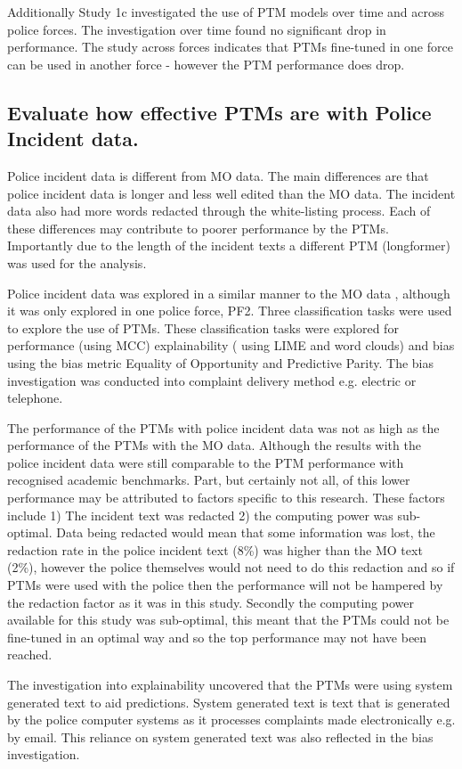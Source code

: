 Additionally Study 1c investigated the use of PTM models over time and across police forces. The investigation over time found no significant drop in performance. The study across forces indicates that PTMs fine-tuned in one force can be used in another force - however the PTM performance does drop. 
 
 
\subsection{Evaluate how effective PTMs are with Police Incident data.} Police incident data is different from MO data. The main differences are that police incident data is longer and less well edited than the MO data. The incident data also had more words redacted through the white-listing process. Each of these differences may contribute to poorer performance by the PTMs. Importantly due to the length of the incident texts a different PTM (longformer) was used for the analysis.

Police incident data was explored in a similar manner to the MO data , although it was only explored in one police force, PF2. Three classification tasks were used to explore the use of PTMs. These classification tasks were explored for performance (using MCC) explainability ( using LIME and word clouds) and bias using the bias metric Equality of Opportunity and Predictive Parity. The bias investigation was conducted into complaint delivery method e.g. electric or telephone.

The performance of the PTMs with police incident data was not as high as the performance of the PTMs with the MO data. Although the results with the police incident data were still comparable to the PTM performance with recognised academic benchmarks. Part, but certainly not all,  of this lower performance may be attributed to factors specific to this research. These factors include 1) The incident text was redacted 2) the computing power was sub-optimal. Data being redacted would mean that some information was lost, the redaction rate in the police incident text (8\%)  was higher than the MO text (2\%), however the police themselves would not need to do this redaction and so if PTMs were used with the police then the performance will not be hampered by the redaction factor as it was in this study. Secondly the computing power available for this study was sub-optimal, this meant that the PTMs could not be fine-tuned in an optimal way and so the top performance may not have been reached. 

The investigation into explainability uncovered that the PTMs were using system generated text to aid predictions. System generated text is text that is generated by the police computer systems as it processes complaints made electronically e.g. by email. This reliance on system generated text was also reflected in the bias investigation.

